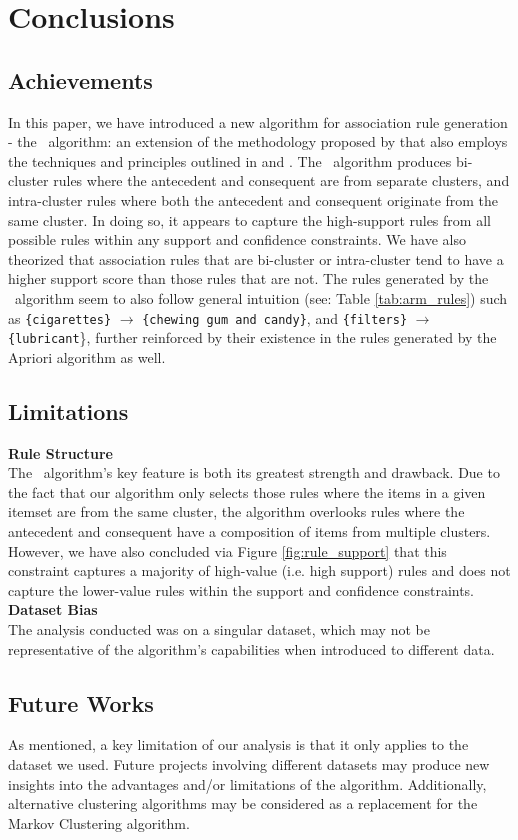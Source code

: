 \chapter{Conclusions}
\section{Achievements}
In this paper, we have introduced a new algorithm for association rule generation - the \algo\ algorithm: an extension of the methodology proposed by  that also employs the techniques and principles outlined in  and . The \algo\ algorithm produces bi-cluster rules where the antecedent and consequent are from separate clusters, and intra-cluster rules where both the antecedent and consequent originate from the same cluster. In doing so, it appears to capture the high-support rules from all possible rules within any support and confidence constraints.  We have also theorized that association rules that are bi-cluster or intra-cluster tend to have a higher support score than those rules that are not. The rules generated by the \algo\ algorithm seem to also follow general intuition (see: Table \ref{tab:arm_rules}) such as \texttt{\{cigarettes\}} $\rightarrow$ \texttt{\{chewing gum and candy\}}, and \texttt{\{filters\}} $\rightarrow$ \texttt{\{lubricant}\}, further reinforced by their existence in the rules generated by the Apriori algorithm as well.

\section{Limitations}
\textbf{Rule Structure}\\
The \algo\ algorithm's key feature is both its greatest strength and drawback. Due to the fact that our algorithm only selects those rules where the items in a given itemset are from the same cluster, the algorithm overlooks rules where the antecedent and consequent have a composition of items from multiple clusters. However, we have also concluded via Figure \ref{fig:rule_support} that this constraint captures a majority of high-value (i.e. high support) rules and does not capture the lower-value rules within the support and confidence constraints.
\\\textbf{Dataset Bias}\\
The analysis conducted was on a singular dataset, which may not be representative of the algorithm's capabilities when introduced to different data. 

\section{Future Works}
As mentioned, a key limitation of our analysis is that it only applies to the dataset we used. Future projects involving different datasets may produce new insights into the advantages and/or limitations of the algorithm. Additionally, alternative clustering algorithms may be considered as a replacement for the Markov Clustering algorithm. 
